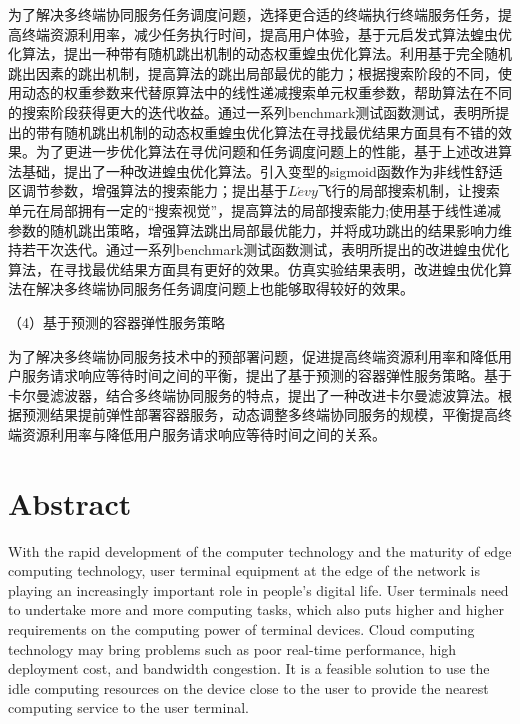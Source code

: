 为了解决多终端协同服务任务调度问题，选择更合适的终端执行终端服务任务，提高终端资源利用率，减少任务执行时间，提高用户体验，基于元启发式算法蝗虫优化算法，提出一种带有随机跳出机制的动态权重蝗虫优化算法。利用基于完全随机跳出因素的跳出机制，提高算法的跳出局部最优的能力；根据搜索阶段的不同，使用动态的权重参数来代替原算法中的线性递减搜索单元权重参数，帮助算法在不同的搜索阶段获得更大的迭代收益。通过一系列benchmark测试函数测试，表明所提出的带有随机跳出机制的动态权重蝗虫优化算法在寻找最优结果方面具有不错的效果。为了更进一步优化算法在寻优问题和任务调度问题上的性能，基于上述改进算法基础，提出了一种改进蝗虫优化算法。引入变型的sigmoid函数作为非线性舒适区调节参数，增强算法的搜索能力；提出基于$L\acute{e}vy$飞行的局部搜索机制，让搜索单元在局部拥有一定的“搜索视觉”，提高算法的局部搜索能力;使用基于线性递减参数的随机跳出策略，增强算法跳出局部最优能力，并将成功跳出的结果影响力维持若干次迭代。通过一系列benchmark测试函数测试，表明所提出的改进蝗虫优化算法，在寻找最优结果方面具有更好的效果。仿真实验结果表明，改进蝗虫优化算法在解决多终端协同服务任务调度问题上也能够取得较好的效果。

（4）基于预测的容器弹性服务策略

为了解决多终端协同服务技术中的预部署问题，促进提高终端资源利用率和降低用户服务请求响应等待时间之间的平衡，提出了基于预测的容器弹性服务策略。基于卡尔曼滤波器，结合多终端协同服务的特点，提出了一种改进卡尔曼滤波算法。根据预测结果提前弹性部署容器服务，动态调整多终端协同服务的规模，平衡提高终端资源利用率与降低用户服务请求响应等待时间之间的关系。

\chapter*{Abstract}%

With the rapid development of the computer technology and the maturity of edge computing technology, user terminal equipment at the edge of the network is playing an increasingly important role in people's digital life. User terminals need to undertake more and more computing tasks, which also puts higher and higher requirements on the computing power of terminal devices. Cloud computing technology may bring problems such as poor real-time performance, high deployment cost, and bandwidth congestion. It is a feasible solution to use the idle computing resources on the device close to the user to provide the nearest computing service to the user terminal.

